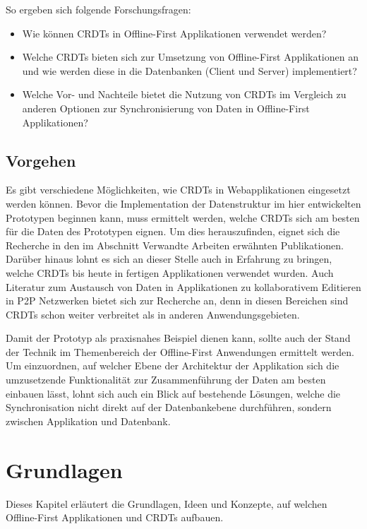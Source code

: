 \documentclass[a4paper, 12pt]{scrreprt}
\begin{document}
So ergeben sich folgende Forschungsfragen:

\begin{itemize}
	\item Wie können \acp{CRDT} in Offline-First Applikationen verwendet werden?
	\item Welche \acp{CRDT} bieten sich zur Umsetzung von Offline-First Applikationen an und wie werden diese in die Datenbanken (Client und Server) implementiert?
	\item Welche Vor- und Nachteile bietet die Nutzung von \acp{CRDT} im Vergleich zu anderen Optionen zur Synchronisierung von Daten in Offline-First Applikationen?
\end{itemize}

\section{Vorgehen}
Es gibt verschiedene Möglichkeiten, wie \acp{CRDT} in Webapplikationen eingesetzt werden können. Bevor die Implementation der Datenstruktur im hier entwickelten Prototypen beginnen kann, muss ermittelt werden, welche \acp{CRDT} sich am besten für die Daten des Prototypen eignen. Um dies herauszufinden, eignet sich die Recherche in den im Abschnitt Verwandte Arbeiten erwähnten Publikationen. Darüber hinaus lohnt es sich an dieser Stelle auch in Erfahrung zu bringen, welche \acp{CRDT} bis heute in fertigen Applikationen verwendet wurden. Auch Literatur zum Austausch von Daten in Applikationen zu kollaborativem Editieren in \ac{P2P} Netzwerken bietet sich zur Recherche an, denn in diesen Bereichen sind \acp{CRDT} schon weiter verbreitet als in anderen Anwendungsgebieten.

Damit der Prototyp als praxisnahes Beispiel dienen kann, sollte auch der Stand der Technik im Themenbereich der Offline-First Anwendungen ermittelt werden. Um einzuordnen, auf welcher Ebene der Architektur der Applikation sich die umzusetzende Funktionalität zur Zusammenführung der Daten am besten einbauen lässt, lohnt sich auch ein Blick auf bestehende Lösungen, welche die Synchronisation nicht direkt auf der Datenbankebene durchführen, sondern zwischen Applikation und Datenbank.

\chapter{Grundlagen}
Dieses Kapitel erläutert die Grundlagen, Ideen und Konzepte, auf welchen Offline-First Applikationen und \acp{CRDT} aufbauen. 
\end{document}
